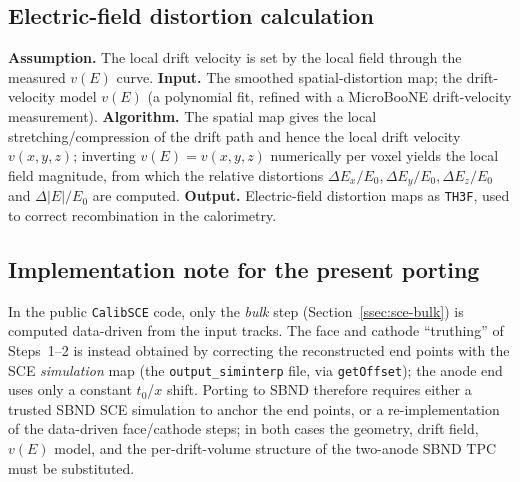 \subsection{Electric-field distortion calculation}
\label{ssec:sce-efield}
\textbf{Assumption.} The local drift velocity is set by the local field through
the measured $v(E)$ curve.
\textbf{Input.} The smoothed spatial-distortion map; the drift-velocity model
$v(E)$ (a polynomial fit, refined with a MicroBooNE drift-velocity
measurement).
\textbf{Algorithm.} The spatial map gives the local stretching/compression of
the drift path and hence the local drift velocity $v(x,y,z)$; inverting
$v(E)=v(x,y,z)$ numerically per voxel yields the local field magnitude, from
which the relative distortions $\Delta E_x/E_0,\Delta E_y/E_0,\Delta E_z/E_0$
and $\Delta|E|/E_0$ are computed.
\textbf{Output.} Electric-field distortion maps as \texttt{TH3F}, used to
correct recombination in the calorimetry.

\subsection{Implementation note for the present porting}
\label{ssec:sce-impl}
In the public \texttt{CalibSCE} code, only the \emph{bulk} step
(Section~\ref{ssec:sce-bulk}) is computed data-driven from the input tracks. The
face and cathode ``truthing'' of Steps~1--2 is instead obtained by correcting
the reconstructed end points with the SCE \emph{simulation} map (the
\texttt{output\_siminterp} file, via \texttt{getOffset}); the anode end uses only
a constant $t_0$/$x$ shift. Porting to SBND therefore requires either a trusted
SBND SCE simulation to anchor the end points, or a re-implementation of the
data-driven face/cathode steps; in both cases the geometry, drift field, $v(E)$
model, and the per-drift-volume structure of the two-anode SBND TPC must be
substituted.
